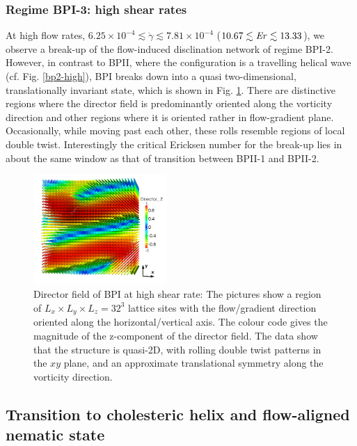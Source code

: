 \documentclass[8.5pt,twoside,twocolumn]{article}
\newcommand{\e}[1]{\times10^{#1}}
\newcommand{\gd}{\dot{\gamma}}
\begin{document}
\subsubsection{Regime BPI-3: high shear rates }

At high flow rates, $6.25\e{-4}\lesssim\gd\lesssim7.81\e{-4}$ ($10.67\lesssim {\it Er}\lesssim 13.33$), 
we observe a break-up of the flow-induced 
disclination network of regime BPI-2. However, 
in contrast to BPII, where the configuration is a travelling helical 
wave (cf. Fig. \ref{bp2-high}), BPI breaks down into a quasi 
two-dimensional, translationally invariant state, which is shown in 
Fig. \ref{bp1-high}. 
There are distinctive regions where the director field is 
predominantly oriented along the vorticity direction and 
other regions where it is oriented rather in flow-gradient plane. 
Occasionally, while moving past each other, these rolls resemble 
regions of local double twist.
Interestingly the critical Ericksen number for the break-up lies in 
about the same window as that of transition between BPII-1 and BPII-2. 

\begin{figure}[htpb]
\includegraphics[width=0.45\textwidth]{dir3d-z-302k_run916.png}
\caption{Director field of BPI at high shear rate: The pictures show a region 
of $L_x\times L_y \times L_z= 32^3$ lattice sites with the flow/gradient 
direction oriented along the horizontal/vertical axis. 
The colour code gives the magnitude of the z-component of the director field. 
The data show that the structure is quasi-2D, with rolling double twist
patterns in the $xy$ plane, and an approximate translational symmetry 
along the vorticity direction.}
\label{bp1-high}
\end{figure}

\subsection{Transition to cholesteric helix and flow-aligned nematic state}\label{cholflow}
\end{document}
